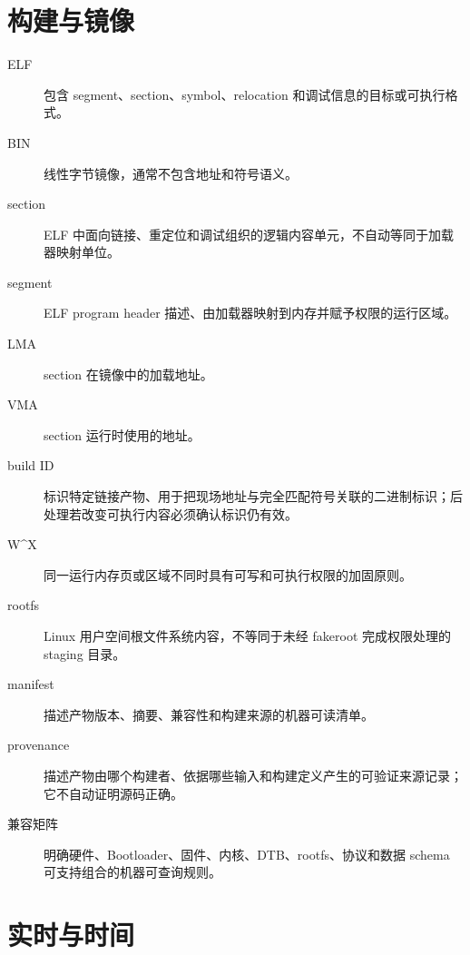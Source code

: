 \section{构建与镜像}

\begin{description}
  \item[ELF] 包含 segment、section、symbol、relocation 和调试信息的目标或可执行格式。
  \item[BIN] 线性字节镜像，通常不包含地址和符号语义。
  \item[section] ELF 中面向链接、重定位和调试组织的逻辑内容单元，不自动等同于加载器映射单位。
  \item[segment] ELF program header 描述、由加载器映射到内存并赋予权限的运行区域。
  \item[LMA] section 在镜像中的加载地址。
  \item[VMA] section 运行时使用的地址。
  \item[build ID] 标识特定链接产物、用于把现场地址与完全匹配符号关联的二进制标识；后处理若改变可执行内容必须确认标识仍有效。
  \item[W\textasciicircum X] 同一运行内存页或区域不同时具有可写和可执行权限的加固原则。
  \item[rootfs] Linux 用户空间根文件系统内容，不等同于未经 fakeroot 完成权限处理的 staging 目录。
  \item[manifest] 描述产物版本、摘要、兼容性和构建来源的机器可读清单。
  \item[provenance] 描述产物由哪个构建者、依据哪些输入和构建定义产生的可验证来源记录；它不自动证明源码正确。
  \item[兼容矩阵] 明确硬件、Bootloader、固件、内核、DTB、rootfs、协议和数据 schema 可支持组合的机器可查询规则。
\end{description}

\section{实时与时间}

